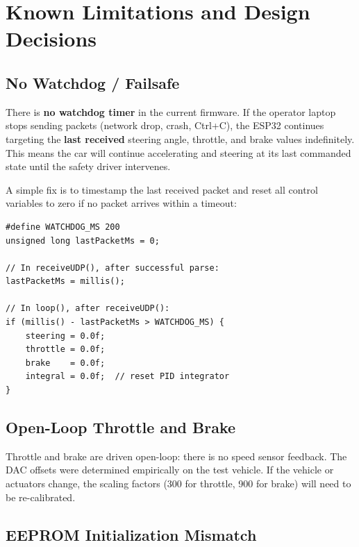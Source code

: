 \documentclass[12pt, letterpaper]{article}
\begin{document}
\section{Known Limitations and Design Decisions}

\subsection{No Watchdog / Failsafe}

\begin{warningbox}
There is \textbf{no watchdog timer} in the current firmware.  If the operator
laptop stops sending packets (network drop, crash, Ctrl+C), the ESP32 continues
targeting the \textbf{last received} steering angle, throttle, and brake values
indefinitely.  This means the car will continue accelerating and steering at its
last commanded state until the safety driver intervenes.
\end{warningbox}

A simple fix is to timestamp the last received packet and reset all control
variables to zero if no packet arrives within a timeout:

\begin{lstlisting}[style=cpp]
#define WATCHDOG_MS 200
unsigned long lastPacketMs = 0;

// In receiveUDP(), after successful parse:
lastPacketMs = millis();

// In loop(), after receiveUDP():
if (millis() - lastPacketMs > WATCHDOG_MS) {
    steering = 0.0f;
    throttle = 0.0f;
    brake    = 0.0f;
    integral = 0.0f;  // reset PID integrator
}
\end{lstlisting}

\subsection{Open-Loop Throttle and Brake}

Throttle and brake are driven open-loop: there is no speed sensor feedback.
The DAC offsets were determined empirically on the test vehicle.  If the vehicle
or actuators change, the scaling factors (300 for throttle, 900 for brake) will
need to be re-calibrated.

\subsection{EEPROM Initialization Mismatch}
\end{document}
